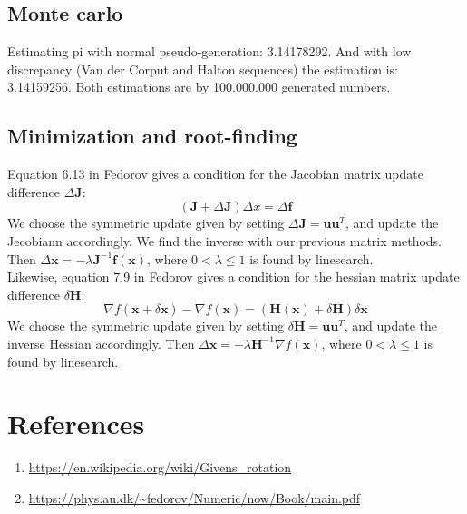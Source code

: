 \documentclass{article}
\begin{document}
\subsection{Monte carlo}
Estimating pi with normal pseudo-generation: 3.14178292. And with low discrepancy (Van der Corput and Halton sequences) the estimation is: 3.14159256. Both estimations are by 100.000.000 generated numbers.


\subsection{Minimization and root-finding}
Equation 6.13 in Fedorov gives a condition for the Jacobian matrix update difference $\Delta \pmb J$:
\begin{equation}
(\pmb J + \Delta \pmb J)\Delta x = \Delta \pmb f
\end{equation}
We choose the symmetric update given by setting $\Delta \pmb J = \pmb u\pmb u^T$, and update the Jecobiann accordingly. We find the inverse with our previous matrix methods. Then $\Delta \pmb x = -\lambda \pmb  J^{-1}\pmb f(\pmb x)$, where $0<\lambda\leq 1$ is found by linesearch.\\

Likewise, equation 7.9 in Fedorov gives a condition for the hessian matrix update difference $\delta \pmb H$:
\begin{equation}
\nabla f(\pmb x+\delta \pmb x) - \nabla f(\pmb x) = (\pmb H(\pmb x) + \delta \pmb H)\delta \pmb x
\end{equation}
We choose the symmetric update given by setting $\delta \pmb H = \pmb u\pmb u^T$, and update the inverse Hessian accordingly. Then $\Delta \pmb x = -\lambda \pmb H^{-1}\nabla f(\pmb x)$, where $0<\lambda\leq 1$ is found by linesearch.
\section{References}
\begin{enumerate}
		\item \url{https://en.wikipedia.org/wiki/Givens_rotation}\\
		\item \url{https://phys.au.dk/~fedorov/Numeric/now/Book/main.pdf}
	\end{enumerate}
\end{document}
